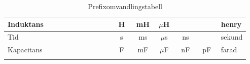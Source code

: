 \begin{longtable}{|l|c|c|c|c|c|c|c|c|c|c|c|l|c|c|c|c|c|c|c|c|c|c|c|c|l|}
	Induktans& \multicolumn{3}{c}{}\vline&\multicolumn{3}{c}{}\vline&\multicolumn{3}{c}{}\vline &\multicolumn{3}{c}{H}\vline&\multicolumn{3}{c}{mH}\vline &\multicolumn{3}{c}{\(\mu\)H}\vline&\multicolumn{3}{c}{}\vline&\multicolumn{3}{c}{ }\vline& henry\\ \hline
		Tid & \multicolumn{3}{c}{}\vline&\multicolumn{3}{c}{}\vline&\multicolumn{3}{c}{}\vline &\multicolumn{3}{c}{s}\vline&\multicolumn{3}{c}{ms}\vline &\multicolumn{3}{c}{\(\mu\)s}\vline&\multicolumn{3}{c}{ns}\vline&\multicolumn{3}{c}{ }\vline& sekund\\ \hline
		Kapacitans& \multicolumn{3}{c}{}\vline&\multicolumn{3}{c}{}\vline&\multicolumn{3}{c}{}\vline &\multicolumn{3}{c}{F}\vline&\multicolumn{3}{c}{mF}\vline &\multicolumn{3}{c}{\(\mu\)F}\vline&\multicolumn{3}{c}{nF}\vline&\multicolumn{3}{c}{pF}\vline& farad\\ \hline
	\caption{Prefixomvandlingstabell}
	\label{Prefixomvandlingstabell}
\end{longtable}
%

\twocolumn
